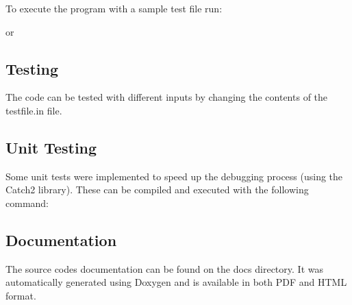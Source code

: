 To execute the program with a sample test file run\+:


\begin{DoxyCode}{0}
\end{DoxyCode}


or


\begin{DoxyCode}{0}
\end{DoxyCode}


\subsection*{Testing}

The code can be tested with different inputs by changing the contents of the {\ttfamily testfile.\+in} file.

\subsection*{Unit Testing}

Some unit tests were implemented to speed up the debugging process (using the Catch2 library). These can be compiled and executed with the following command\+:


\begin{DoxyCode}{0}
\end{DoxyCode}


\subsection*{Documentation}

The source code\textquotesingle{}s documentation can be found on the {\ttfamily docs} directory. It was automatically generated using Doxygen and is available in both P\+DF and H\+T\+ML format. 